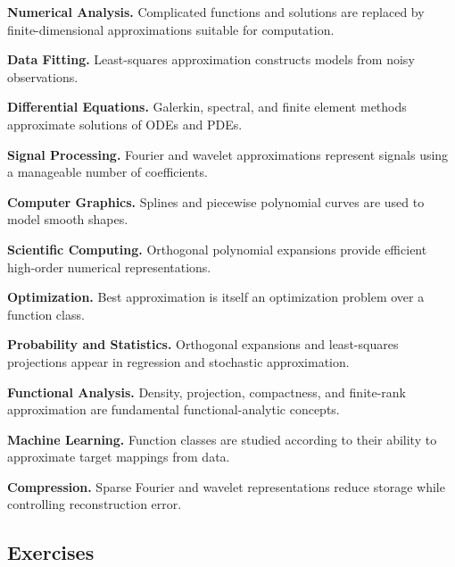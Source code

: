 \begin{applicationbox}
\textbf{Numerical Analysis.}
Complicated functions and solutions are replaced by finite-dimensional
approximations suitable for computation.

\medskip

\textbf{Data Fitting.}
Least-squares approximation constructs models from noisy observations.

\medskip

\textbf{Differential Equations.}
Galerkin, spectral, and finite element methods approximate solutions of
ODEs and PDEs.

\medskip

\textbf{Signal Processing.}
Fourier and wavelet approximations represent signals using a manageable
number of coefficients.

\medskip

\textbf{Computer Graphics.}
Splines and piecewise polynomial curves are used to model smooth shapes.

\medskip

\textbf{Scientific Computing.}
Orthogonal polynomial expansions provide efficient high-order numerical
representations.

\medskip

\textbf{Optimization.}
Best approximation is itself an optimization problem over a function
class.

\medskip

\textbf{Probability and Statistics.}
Orthogonal expansions and least-squares projections appear in regression
and stochastic approximation.

\medskip

\textbf{Functional Analysis.}
Density, projection, compactness, and finite-rank approximation are
fundamental functional-analytic concepts.

\medskip

\textbf{Machine Learning.}
Function classes are studied according to their ability to approximate
target mappings from data.

\medskip

\textbf{Compression.}
Sparse Fourier and wavelet representations reduce storage while
controlling reconstruction error.
\end{applicationbox}

\subsection{Exercises}
\label{subsec:approximation-theory-exercises}

